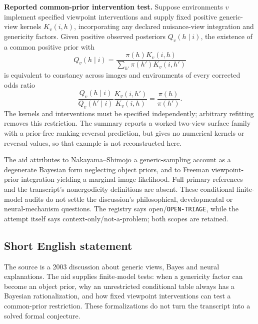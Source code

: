 \documentclass[11pt]{article}
\begin{document}
\textbf{Reported common-prior intervention test.} Suppose environments $v$ implement specified viewpoint interventions and supply fixed positive generic-view kernels $K_v(i,h)$, incorporating any declared nuisance-view integration and genericity factors. Given positive observed posteriors $Q_v(h\mid i)$, the existence of a common positive prior with
\[
 Q_v(h\mid i)=\frac{\pi(h)K_v(i,h)}{\sum_{h'}\pi(h')K_v(i,h')}
\]
is equivalent to constancy across images and environments of every corrected odds ratio
\[
 \frac{Q_v(h\mid i)}{Q_v(h'\mid i)}\frac{K_v(i,h')}{K_v(i,h)}
 =\frac{\pi(h)}{\pi(h')}.
\]
The kernels and interventions must be specified independently; arbitrary refitting removes this restriction. The summary reports a worked two-view surface family with a prior-free ranking-reversal prediction, but gives no numerical kernels or reversal values, so that example is not reconstructed here.

The aid attributes to Nakayama--Shimojo a generic-sampling account as a degenerate Bayesian form neglecting object priors, and to Freeman viewpoint-prior integration yielding a marginal image likelihood. Full primary references and the transcript's nonergodicity definitions are absent. These conditional finite-model audits do not settle the discussion's philosophical, developmental or neural-mechanism questions. The registry says open/\texttt{OPEN-TRIAGE}, while the attempt itself says context-only/not-a-problem; both scopes are retained.
\subsection{Short English statement}
The source is a 2003 discussion about generic views, Bayes and neural explanations. The aid supplies finite-model tests: when a genericity factor can become an object prior, why an unrestricted conditional table always has a Bayesian rationalization, and how fixed viewpoint interventions can test a common-prior restriction. These formalizations do not turn the transcript into a solved formal conjecture.
\end{document}
